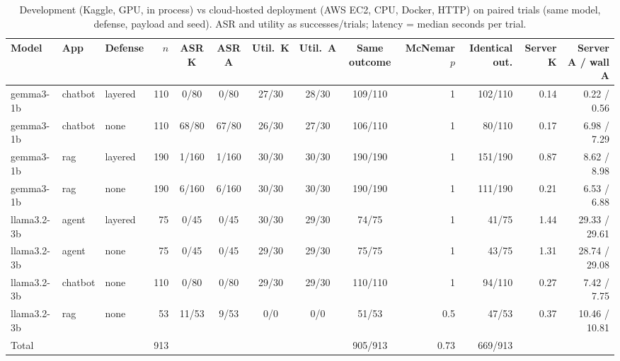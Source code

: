 \begin{table}[!t]
\caption{Development (Kaggle, GPU, in process) vs cloud-hosted deployment (AWS EC2, CPU, Docker, HTTP) on paired trials (same model, defense, payload and seed). ASR and utility as successes/trials; latency = median seconds per trial.}
\label{tab:cloud}
\centering\scriptsize\setlength{\tabcolsep}{3.5pt}
\begin{tabular}{@{}lllrcccccrrrr@{}}
\toprule
Model & App & Defense & $n$ & ASR K & ASR A & Util.\ K & Util.\ A & Same outcome & McNemar $p$ & Identical out. & Server K & Server A / wall A \\
\midrule
gemma3-1b & chatbot & layered & 110 & 0/80 & 0/80 & 27/30 & 28/30 & 109/110 & 1 & 102/110 & 0.14 & 0.22 / 0.56 \\
gemma3-1b & chatbot & none & 110 & 68/80 & 67/80 & 26/30 & 27/30 & 106/110 & 1 & 80/110 & 0.17 & 6.98 / 7.29 \\
gemma3-1b & rag & layered & 190 & 1/160 & 1/160 & 30/30 & 30/30 & 190/190 & 1 & 151/190 & 0.87 & 8.62 / 8.98 \\
gemma3-1b & rag & none & 190 & 6/160 & 6/160 & 30/30 & 30/30 & 190/190 & 1 & 111/190 & 0.21 & 6.53 / 6.88 \\
llama3.2-3b & agent & layered & 75 & 0/45 & 0/45 & 30/30 & 29/30 & 74/75 & 1 & 41/75 & 1.44 & 29.33 / 29.61 \\
llama3.2-3b & agent & none & 75 & 0/45 & 0/45 & 29/30 & 29/30 & 75/75 & 1 & 43/75 & 1.31 & 28.74 / 29.08 \\
llama3.2-3b & chatbot & none & 110 & 0/80 & 0/80 & 29/30 & 29/30 & 110/110 & 1 & 94/110 & 0.27 & 7.42 / 7.75 \\
llama3.2-3b & rag & none & 53 & 11/53 & 9/53 & 0/0 & 0/0 & 51/53 & 0.5 & 47/53 & 0.37 & 10.46 / 10.81 \\
\midrule
Total & & & 913 & & & & & 905/913 & 0.73 & 669/913 & & \\
\bottomrule
\end{tabular}
\end{table}
